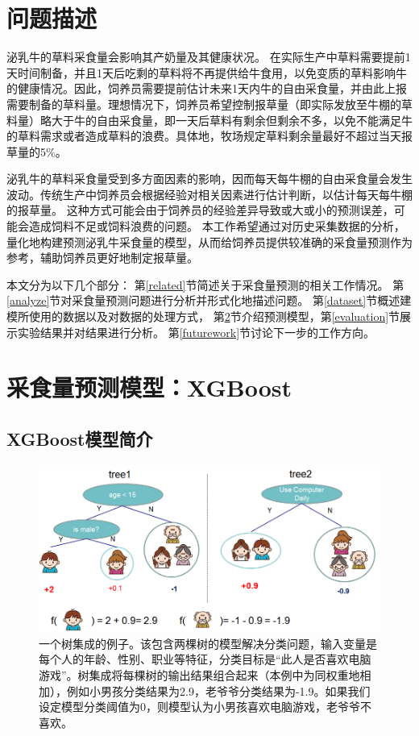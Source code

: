 \section{问题描述}
\label{introduction}


泌乳牛的草料采食量会影响其产奶量及其健康状况。
在实际生产中草料需要提前1天时间制备，并且1天后吃剩的草料将不再提供给牛食用，以免变质的草料影响牛的健康情况。因此，饲养员需要提前估计未来1天内牛的自由采食量，并由此上报需要制备的草料量。理想情况下，饲养员希望控制报草量（即实际发放至牛棚的草料量）略大于牛的自由采食量，即一天后草料有剩余但剩余不多，以免不能满足牛的草料需求或者造成草料的浪费。具体地，牧场规定草料剩余量最好不超过当天报草量的5\%。

泌乳牛的草料采食量受到多方面因素的影响，因而每天每牛棚的自由采食量会发生波动。传统生产中饲养员会根据经验对相关因素进行估计判断，以估计每天每牛棚的报草量。
这种方式可能会由于饲养员的经验差异导致或大或小的预测误差，可能会造成饲料不足或饲料浪费的问题。
本工作希望通过对历史采集数据的分析，量化地构建预测泌乳牛采食量的模型，从而给饲养员提供较准确的采食量预测作为参考，辅助饲养员更好地制定报草量。

本文分为以下几个部分：
第\ref{related}节简述关于采食量预测的相关工作情况。
第\ref{analyze}节对采食量预测问题进行分析并形式化地描述问题。
第\ref{dataset}节概述建模所使用的数据以及对数据的处理方式，
第\ref{model}节介绍预测模型，第\ref{evaluation}节展示实验结果并对结果进行分析。
第\ref{futurework}节讨论下一步的工作方向。
\section{采食量预测模型：XGBoost}
\label{model}

\subsection{XGBoost模型简介}

\begin{figure}
\begin{center}
	\includegraphics[width=0.8\linewidth]{twocart}
\caption{一个树集成的例子。该包含两棵树的模型解决分类问题，输入变量是每个人的年龄、性别、职业等特征，分类目标是“此人是否喜欢电脑游戏”。树集成将每棵树的输出结果组合起来（本例中为同权重地相加），例如小男孩分类结果为2.9，老爷爷分类结果为-1.9。如果我们设定模型分类阈值为0，则模型认为小男孩喜欢电脑游戏，老爷爷不喜欢。}
\label{twocart}
\end{center}
\end{figure}


